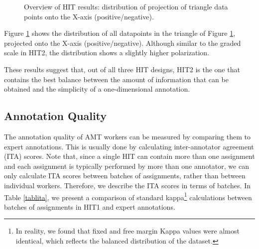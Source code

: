 \documentclass[11pt, a4paper,onecolumn]{article}
\begin{document}
\begin{figure}
  \begin{center}
	\caption{Overview of HIT results: distribution of projection of triangle data points onto the X-axis (positive/negative).}
	\label{distr3b}
  \end{center}
\end{figure}


Figure \ref{distr3b} shows the distribution of all datapoints in the triangle of Figure \ref{distr3b}, projected onto the X-axis (positive/negative). Although similar to the graded scale in HIT2, the distribution shows a slightly higher polarization.

These results suggest that, out of all three HIT designs, HIT2 is the one that contains the best balance between the amount of information that can be obtained and the simplicity of a one-dimensional annotation. 



\subsection{Annotation Quality}
\label{sect:quality}

The annotation quality of AMT workers can be measured by comparing them to expert annotations. This is usually done by calculating inter-annotator agreement (ITA) scores. Note that, since a single HIT can contain more than one assignment and each assignment is typically performed by more than one annotator, we can only calculate ITA scores between batches of assignments, rather than between individual workers. Therefore, we describe the ITA scores in terms of batches. In Table \ref{tablita}, we present a comparison of standard kappa\footnote{In reality, we found that fixed and free margin Kappa values were almost identical, which reflects the balanced distribution of the dataset.} calculations \cite{eugenio_kappa_2004} between batches of assignments in HIT1 and expert annotations.
\end{document}
